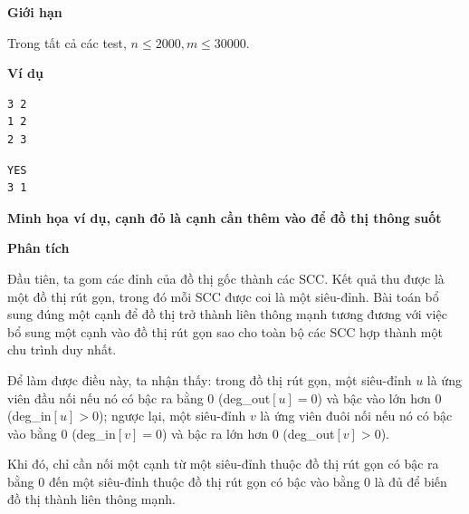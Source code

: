 \documentclass{article}
\begin{document}
\textbf{Giới hạn}

Trong tất cả các test, $n \leq 2000, m \leq 30000$.

\textbf{Ví dụ}

\begin{lstlisting}[caption={Input}]
3 2
1 2
2 3
\end{lstlisting}

\begin{lstlisting}[caption={Output}]
YES
3 1
\end{lstlisting}

\textbf{Minh họa ví dụ, cạnh đỏ là cạnh cần thêm vào để đồ thị thông suốt}

\begin{center}
\end{center}

\textbf{Phân tích}

Đầu tiên, ta gom các đỉnh của đồ thị gốc thành các SCC. Kết quả thu được là một đồ thị rút gọn, trong đó mỗi SCC được coi là một siêu-đỉnh. Bài toán bổ sung đúng một cạnh để đồ thị trở thành liên thông mạnh tương đương với việc bổ sung một cạnh vào đồ thị rút gọn sao cho toàn bộ các SCC hợp thành một chu trình duy nhất.

Để làm được điều này, ta nhận thấy: trong đồ thị rút gọn, một siêu-đỉnh $u$ là ứng viên đầu nối nếu nó có bậc ra bằng 0 (deg\_out$[u]=0$) và bậc vào lớn hơn 0 (deg\_in$[u] > 0$); ngược lại, một siêu-đỉnh $v$ là ứng viên đuôi nối nếu nó có bậc vào bằng 0 (deg\_in$[v]=0$) và bậc ra lớn hơn 0 (deg\_out$[v] > 0$).

Khi đó, chỉ cần nối một cạnh từ một siêu-đỉnh thuộc đồ thị rút gọn có bậc ra bằng 0 đến một siêu-đỉnh thuộc đồ thị rút gọn có bậc vào bằng 0 là đủ để biến đồ thị thành liên thông mạnh.

\end{document}
